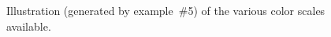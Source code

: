 \begin{figure}[h!]
\caption{%
\label{page:merge_wmapKband}%
\label{fig:merge_wmapKband}%
Illustration (generated by example~\#5) of the various color scales available.}
\end{figure}


